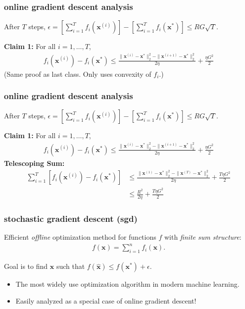 \documentclass[compress]{beamer}
\newcommand{\bv}[1]{\mathbf{#1}}
\begin{document}
\begin{frame}[t]
	\frametitle{online gradient descent analysis}
	\begin{theorem}
		After $T$ steps, $\epsilon = \left[\sum_{i=1}^T f_i(\bv{x}^{(i)})\right] - \left[\sum_{i=1}^T f_i(\bv{x}^*)\right] \leq RG\sqrt{T}$.
	\end{theorem}
	\textbf{Claim 1:} For all $i = 1, \ldots, T$, 
	\begin{align*}
		f_i(\bv{x}^{(i)}) - f_i(\bv{x}^*) \leq \frac{\|\bv{x}^{(i)} - \bv{x}^*\|_2^2 - \|\bv{x}^{(i+1)} - \bv{x}^*\|_2^2}{2\eta} + \frac{\eta G^2}{2}
	\end{align*}
(Same proof as last class. Only uses convexity of $f_i$.)

\end{frame}

\begin{frame}[t]
	\frametitle{online gradient descent analysis}
	\begin{theorem}
		After $T$ steps, $\epsilon = \left[\sum_{i=1}^T f_i(\bv{x}^{(i)})\right] - \left[\sum_{i=1}^T f_i(\bv{x}^*)\right] \leq RG\sqrt{T}$.
	\end{theorem}
	\textbf{Claim 1:} For all $i = 1, \ldots, T$, 
	\begin{align*}
		f_i(\bv{x}^{(i)}) - f_i(\bv{x}^*) \leq \frac{\|\bv{x}^{(i)} - \bv{x}^*\|_2^2 - \|\bv{x}^{(i+1)} - \bv{x}^*\|_2^2}{2\eta} + \frac{\eta G^2}{2}
	\end{align*}
	\textbf{Telescoping Sum:} 
	\begin{align*}
		\sum_{i=1}^{T}\left[f_i(\bv{x}^{(i)}) - f_i(\bv{x}^*)\right] &\leq \frac{\|\bv{x}^{(1)}-\bv{x}^*\|_2^2 -\|\bv{x}^{(T)}-\bv{x}^*\|_2^2}{2\eta} + \frac{T\eta G^2}{2} \\ &\leq  \frac{R^2}{2\eta} + \frac{T\eta G^2}{2}
	\end{align*}
	
	
\end{frame}

\begin{frame}
	\frametitle{stochastic gradient descent (sgd)}
	Efficient \emph{offline} optimization method for functions $f$ with \emph{finite sum structure}:
	\begin{align*}
		f(\bv{x}) = \sum_{i=1}^n f_i(\bv{x}).
	\end{align*}
	
	
	Goal is to find $\hat{\bv{x}}$ such that $f(\hat{\bv{x}}) \leq f(\bv{x}^*) + \epsilon$. 
	
	\begin{itemize}
		\item The most widely use optimization algorithm in modern machine learning. 
		\item Easily analyzed as a special case of {online} gradient descent! 
	\end{itemize}
\end{frame}
\end{document}
